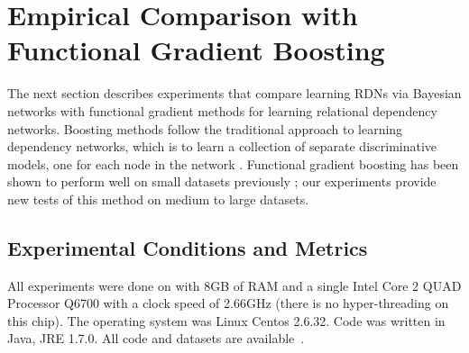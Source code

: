 \documentclass[runningheads,a4paper]{llncs}
\begin{document}
 
%
%
%
%

\section{Empirical Comparison with Functional Gradient Boosting}\label{sec:empirical-comparison}

The next section describes experiments that compare learning RDNs via Bayesian networks with functional gradient methods for learning relational dependency networks. Boosting methods follow the traditional approach to learning dependency networks, which is to learn a collection of separate discriminative models, one for each node in the network \cite{Heckerman2000}. Functional gradient boosting has been shown to perform well on small datasets previously \cite{Khot2011,Natarajan2012}; our experiments provide new tests of this method on medium to large datasets. 
\subsection{Experimental Conditions and Metrics}\label{sec:conditions}
All experiments were done on with 8GB of RAM and a single Intel Core 2 QUAD Processor Q6700 with a clock speed of 2.66GHz (there is no hyper-threading on this chip). The operating system was Linux Centos 2.6.32. Code was written in Java, JRE 1.7.0. All code and datasets are available~\cite{bib:jbnsite}. 
\end{document}
